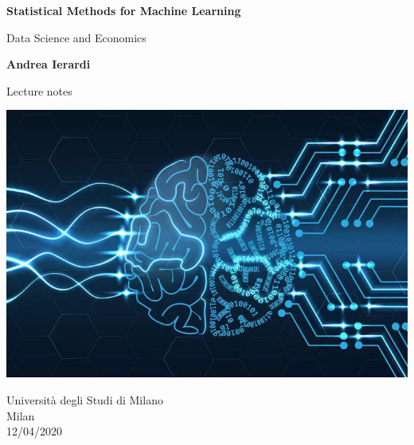 \documentclass[12pt]{article}
\begin{document}
\begin{titlepage}
    \begin{center}
        \vspace*{1cm}
            
        \Huge
        \textbf{Statistical Methods for Machine Learning}
            
        \vspace{0.5cm}
        \LARGE
        Data Science and Economics
            
        \vspace{1.5cm}
            
        \textbf{Andrea Ierardi}
            
        \vfill
            
        Lecture notes
            
        \vspace{0.8cm}
            
 \includegraphics[width=.7\linewidth]{frontpage.jpg}
            
        \Large
        Università degli Studi di Milano
        \\
        Milan\\
        12/04/2020
            
    \end{center}
\end{titlepage}


\newpage

\tableofcontents
\newpage




\newpage


\newpage


\newpage



\newpage



\newpage



\newpage



\newpage



\newpage



\newpage


\newpage


\end{document}
